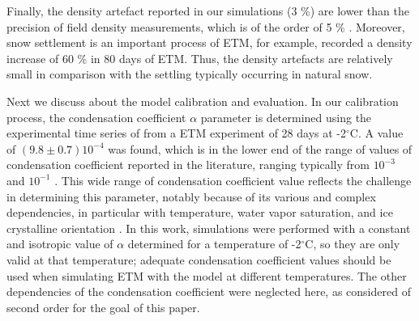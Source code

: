 \documentclass[draft,ms]{agujournal2019}
\begin{document}
Finally, the density artefact reported in our simulations (3 \%)  are lower than the precision of field density measurements, which is of the order of 5 \% \cite{proksch2016intercomparison}. Moreover, snow settlement is an important process of ETM, for example,  recorded a density increase of 60 \% in 80 days of ETM. Thus, the density artefacts are relatively small in comparison with the settling typically occurring in natural snow.


Next we discuss about the model calibration and evaluation.
In our calibration process, the condensation coefficient $\alpha$ parameter is determined using the experimental time series of  from a ETM experiment of 28 days at -2$^\circ$C. A value of $(9.8 \pm 0.7) 10^{-4}$ was found, which is in the lower end of the range of values of condensation coefficient reported in the literature, ranging typically from  $10^{-3}$ and $10^{-1}$ \cite{libbrecht2019snow}. This wide range of condensation coefficient value reflects the challenge in determining this parameter, notably because of its various and complex dependencies, in particular with temperature, water vapor saturation, and ice crystalline orientation \cite{libbrecht2019snow}.
In this work, simulations were performed with a constant and isotropic value of $\alpha$ determined for a temperature of -2$^\circ$C, so they are only valid at that temperature; adequate condensation coefficient values should be used when simulating ETM with the model at different temperatures. The other dependencies of the condensation coefficient were neglected here, as considered of second order for the goal of this paper.
\end{document}
